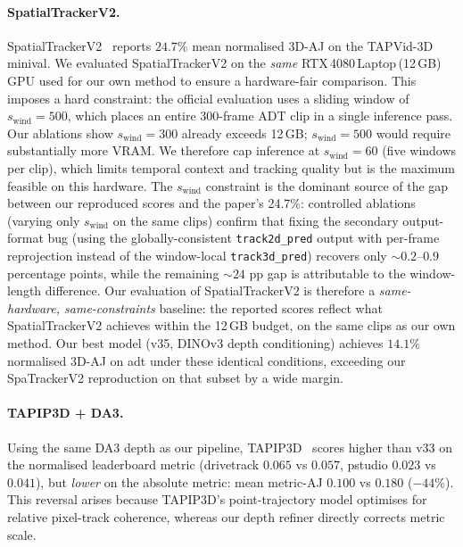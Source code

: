 \documentclass[11pt,a4paper]{article}
\begin{document}
\paragraph{SpatialTrackerV2.}
\label{sec:spatrackerv2}
SpatialTrackerV2~\cite{spatrackerv2} reports $24.7\%$ mean normalised 3D-AJ on the TAPVid-3D
minival.  We evaluated SpatialTrackerV2 on the \emph{same} RTX\,4080\,Laptop\,(12\,GB) GPU used
for our own method to ensure a hardware-fair comparison.
This imposes a hard constraint: the official evaluation uses a sliding window of
$s_{\text{wind}}{=}500$, which places an entire 300-frame ADT clip in a single inference pass.
Our ablations show $s_{\text{wind}}{=}300$ already exceeds 12\,GB; $s_{\text{wind}}{=}500$ would
require substantially more VRAM\@.  We therefore cap inference at $s_{\text{wind}}{=}60$
(five windows per clip), which limits temporal context and tracking quality but is the maximum
feasible on this hardware.  The $s_{\text{wind}}$ constraint is the dominant source of the gap
between our reproduced scores and the paper's 24.7\%: controlled ablations (varying only
$s_{\text{wind}}$ on the same clips) confirm that fixing the secondary output-format bug
(using the globally-consistent \texttt{track2d\_pred} output with per-frame reprojection
instead of the window-local \texttt{track3d\_pred}) recovers only ${\sim}0.2$--$0.9$ percentage
points, while the remaining ${\sim}24$ pp gap is attributable to the window-length difference.
Our evaluation of SpatialTrackerV2 is therefore a \emph{same-hardware, same-constraints} baseline:
the reported scores reflect what SpatialTrackerV2 achieves within the 12\,GB budget, on the
same clips as our own method.  Our best model (v35, DINOv3 depth conditioning) achieves
$14.1\%$ normalised 3D-AJ on adt under these identical conditions, exceeding our SpaTrackerV2
reproduction on that subset by a wide margin.

\paragraph{TAPIP3D + DA3.}
Using the same DA3 depth as our pipeline, TAPIP3D~\cite{tapip3d} scores higher than v33 on the
normalised leaderboard metric (drivetrack $0.065$ vs $0.057$, pstudio $0.023$ vs $0.041$), but
\emph{lower} on the absolute metric: mean metric-AJ $0.100$ vs $0.180$ ($-44\%$).
This reversal arises because TAPIP3D's point-trajectory model optimises for relative
pixel-track coherence, whereas our depth refiner directly corrects metric scale.
\end{document}
